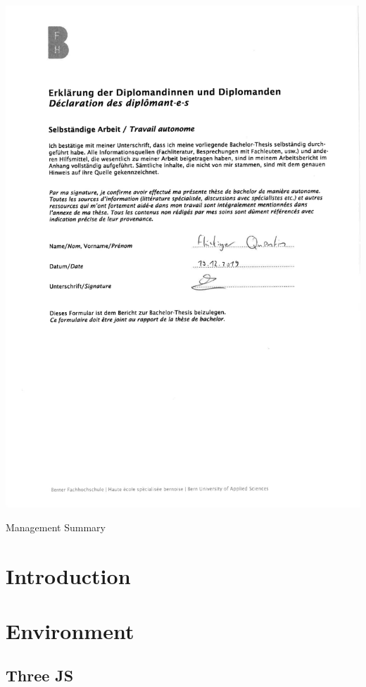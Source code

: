 \documentclass{scrbook}
\begin{document}
\includegraphics{./Declaration_of_authonomy.pdf}
\clearpage

Management Summary
\clearpage

\tableofcontents
\clearpage

\chapter{Introduction}

\chapter{Environment}

\section{Three JS}
\end{document}
